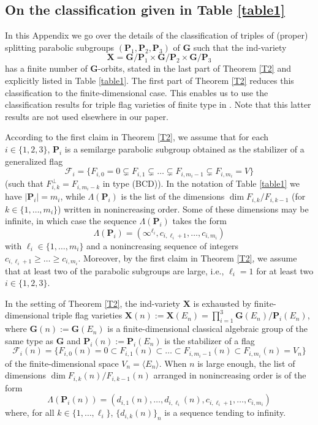 \documentclass[12pt]{amsart}
\newcommand{\G}{\mathbf{G}}
\renewcommand{\P}{\mathbf{P}}
\newcommand{\X}{\mathbf{X}}
\newcommand{\Ff}{\mathcal{F}}
\renewcommand{\span}[1]{\langle #1\rangle}
\newcommand{\length}[1]{|#1|}
\numberwithin{equation}{section}
\theoremstyle{definition}
\begin{document}
\begin{appendix}

\section{On the classification given in Table \ref{table1}}
\label{appendix}

In this Appendix we go over the details of the classification of triples of (proper) splitting parabolic subgroups $(\P_1,\P_2,\P_3)$ of $\G$ such that the ind-variety
\[\X=\G/\P_1\times\G/\P_2\times\G/\P_3\]
has a finite number of $\G$-orbits,
stated in the last part of Theorem \ref{T2} and explicitly listed in Table \ref{table1}. 
The first part of Theorem \ref{T2} reduces this classification to the finite-dimensional case.
This enables us to use the classification results for triple flag varieties of finite type in \cite{MWZ1,MWZ2,Matsuki1,Matsuki2}.
Note that this latter results are not used elsewhere in our paper.

According to the first claim in Theorem \ref{T2}, we assume that for each $i\in\{1,2,3\}$, $\P_i$ is a semilarge parabolic subgroup obtained as the stabilizer of a generalized flag
\[\Ff_i=\{F_{i,0}=0\subsetneq F_{i,1}\subsetneq\ldots\subsetneq F_{i,m_i-1}\subsetneq F_{i,m_i}=V\}\]
(such that $F_{i,k}^\perp=F_{i,m_i-k}$ in type (BCD)).
In the notation of Table \ref{table1} we have
$\length{\P_i}=m_i$, while $\Lambda(\P_i)$ is the list of the dimensions $\dim F_{i,k}/F_{i,k-1}$ (for $k\in\{1,\ldots,m_i\}$) written in nonincreasing order. Some of these dimensions may be infinite, in which case the sequence $\Lambda(\P_i)$ takes the form
\[
\Lambda(\P_i)=(\infty^{\ell_i},c_{i,\ell_i+1},\ldots,c_{i,m_i})
\]
with $\ell_i\in\{1,\ldots,m_i\}$ and a nonincreasing sequence of integers $c_{i,\ell_i+1}\geq\ldots\geq c_{i,m_i}$. Moreover, by the first claim in Theorem \ref{T2}, we assume that at least two of the parabolic subgroups are large, i.e., $\ell_i=1$
for at least two $i\in\{1,2,3\}$.

In the setting of Theorem \ref{T2}, the ind-variety $\X$ is exhausted by finite-dimensional triple flag varieties $\X(n):=\X(E_n)=\prod_{i=1}^3\G(E_n)/\P_i(E_n)$,
where $\G(n):=\G(E_n)$ is a finite-dimensional classical algebraic group of the same type as $\G$ and $\P_i(n):=\P_i(E_n)$ is the stabilizer of a flag
\[\Ff_i(n)=\{F_{i,0}(n)=0\subset F_{i,1}(n)\subset\ldots\subset F_{i,m_i-1}(n)\subset F_{i,m_i}(n)=V_n\}\]
of the finite-dimensional space $V_n=\span{E_n}$.
When $n$ is large enough, 
the list of dimensions $\dim F_{i,k}(n)/F_{i,k-1}(n)$ arranged in nonincreasing order is of the form
\[
\Lambda(\P_i(n))=(d_{i,1}(n),\ldots,d_{i,\ell_i}(n),c_{i,\ell_i+1},\ldots,c_{i,m_i})
\]
where, for all $k\in\{1,\ldots,\ell_i\}$, $\{d_{i,k}(n)\}_n$ is a sequence tending to infinity.


\end{appendix}
\end{document}
